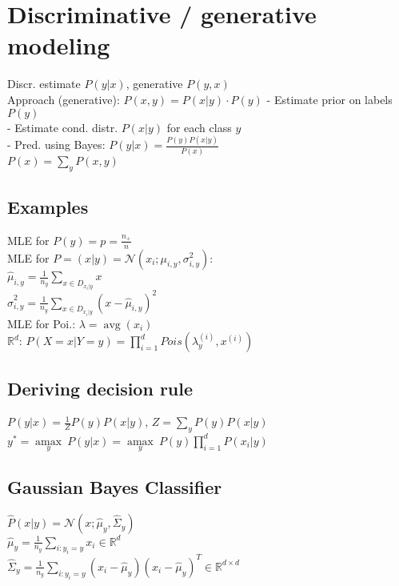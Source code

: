 \section*{Discriminative / generative modeling}
Discr. estimate $P(y|x)$, generative $P(y,x)$ \\
Approach (generative): $P(x,y) = P(x|y) \cdot P(y)$
- Estimate prior on labels $P(y)$\\
- Estimate cond. distr. $P(x|y)$ for each class $y$\\
- Pred. using Bayes:
$P(y|x) = \frac{P(y) P(x|y)}{P(x)}$\\
$P(x) = \sum_y P(x,y)$


\subsection*{Examples}
MLE for $P(y) = p = \frac{n_+}{n}$\\
MLE for $P=(x|y) = \mathcal{N}(x_i;\mu_{i,y}, \sigma_{i,y}^2)$:\\
$\hat{\mu}_{i,y} = \frac{1}{n_y} \sum_{x\in D_{x_i|y}} x$\\
$\hat{\sigma}_{i,y}^2 = \frac{1}{n_y} \sum_{x\in D_{x_i|y}} (x-\hat{\mu}_{i,y})^2$\\
MLE for Poi.: $\lambda = \operatorname{avg}(x_i) $\\
$\mathbb{R}^d$: $P(X = x|Y = y) = \prod_{i=1}^dPois(\lambda_y^{(i)},x^{(i)})$


\subsection*{Deriving decision rule}
$P(y|x) = \frac{1}{Z} P(y)P(x|y)$, $Z = \sum_y P(y) P(x|y)$\\
$y^* = \underset{y}{\operatorname{amax}} ~ P(y|x) = 
\underset{y}{\operatorname{amax}} ~ P(y) \prod_{i=1}^d P(x_i|y)$

\subsection*{Gaussian Bayes Classifier}
$\hat{P}(x|y) = \mathcal{N}(x ; \hat{\mu}_y, \hat{\Sigma}_y)$\\
$\hat{\mu}_{y} = \frac{1}{n_y} \sum_{i:y_i=y} x_i \in \mathbb{R}^d$\\
$\hat{\Sigma}_{y} = \frac{1}{n_y} \sum_{i:y_i=y} (x_i - \hat{\mu}_{y})(x_i-\hat{\mu}_y)^T \in \mathbb{R}^{d \times d}$

